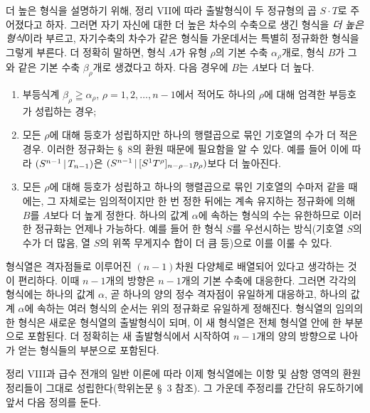 더 높은 형식을 설명하기 위해, 정리 VII에 따라 출발형식이 두 정규형의 곱 $S\cdot T$로 주어졌다고 하자. 그러면 자기 자신에 대한 더 높은 차수의 수축으로 생긴 형식을 \emph{더 높은 형식}이라 부르고, 자기수축의 차수가 같은 형식들 가운데서는 특별히 정규화한 형식을 그렇게 부른다. 더 정확히 말하면, 형식 $A$가 유형 $\rho$의 기본 수축 $\alpha_\rho$개로, 형식 $B$가 그와 같은 기본 수축 $\beta_\rho$개로 생겼다고 하자. 다음 경우에 $B$는 $A$보다 더 높다.
\begin{enumerate}
\renewcommand{\labelenumi}{\arabic{enumi})}
\item 부등식계 $\beta_\rho\geqq\alpha_\rho$, $\rho=1,2,\ldots,n-1$에서 적어도 하나의 $\rho$에 대해 엄격한 부등호가 성립하는 경우;
\item 모든 $\rho$에 대해 등호가 성립하지만 하나의 행렬곱으로 묶인 기호열의 수가 더 적은 경우. 이러한 정규화는 \S\ 8의 환원 때문에 필요함을 알 수 있다. 예를 들어 이에 따라 $(S^{n-1}\,|\,T_{n-1})$은 $(S^{n-1}\,|\,[S^1T^\rho]_{n-\rho-1}p_\rho)$보다 더 높아진다.
\item 모든 $\rho$에 대해 등호가 성립하고 하나의 행렬곱으로 묶인 기호열의 수마저 같을 때에는, 그 자체로는 임의적이지만 한 번 정한 뒤에는 계속 유지하는 정규화에 의해 $B$를 $A$보다 더 높게 정한다. 하나의 값계 $\alpha$에 속하는 형식의 수는 유한하므로 이러한 정규화는 언제나 가능하다. 예를 들어 한 형식 $S$를 우선시하는 방식(기호열 $S$의 수가 더 많음, 열 $S$의 위쪽 무게지수 합이 더 큼 등)으로 이를 이룰 수 있다.
\end{enumerate}
형식열은 격자점들로 이루어진 $(n-1)$차원 다양체로 배열되어 있다고 생각하는 것이 편리하다. 이때 $n-1$개의 방향은 $n-1$개의 기본 수축에 대응한다. 그러면 각각의 형식에는 하나의 값계 $\alpha$, 곧 하나의 양의 정수 격자점이 유일하게 대응하고, 하나의 값계 $\alpha$에 속하는 여러 형식의 순서는 위의 정규화로 유일하게 정해진다. 형식열의 임의의 한 형식은 새로운 형식열의 출발형식이 되며, 이 새 형식열은 전체 형식열 안에 한 부분으로 포함된다. 더 정확히는 새 출발형식에서 시작하여 $n-1$개의 양의 방향으로 나아가 얻는 형식들의 부분으로 포함된다.

정리 VIII과 급수 전개의 일반 이론에 따라 이제 형식열에는 이항 및 삼항 영역의 환원 정리들이 그대로 성립한다(학위논문 \S\ 3 참조). 그 가운데 주정리를 간단히 유도하기에 앞서 다음 정의를 둔다.

